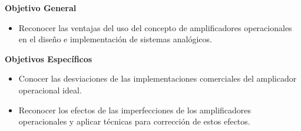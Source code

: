 \textbf{Objetivo General}

\begin{itemize}
    \item Reconocer las ventajas del uso del concepto de amplificadores operacionales en el diseño e implementación de sistemas analógicos.
\end{itemize}

\textbf{Objetivos Específicos}

\begin{itemize}
    \item Conocer las desviaciones de las implementaciones comerciales del amplicador operacional ideal.
    \item Reconocer los efectos de las imperfecciones de los amplificadores operacionales y aplicar técnicas para corrección de estos efectos.
\end{itemize}
